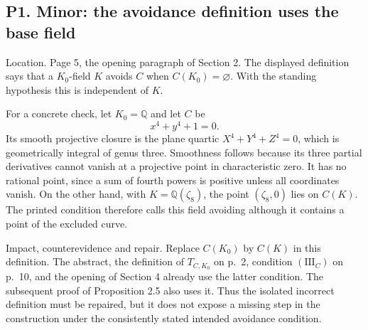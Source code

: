 \documentclass[10pt]{article}
\begin{document}
\subsection*{P1. Minor: the avoidance definition uses the base field}
Location. Page 5, the opening paragraph of Section 2. The displayed definition says that a \(K_0\)-field \(K\) avoids \(C\) when \(C(K_0)=\varnothing\). With the standing hypothesis this is independent of \(K\).\par
For a concrete check, let \(K_0=\mathbb Q\) and let \(C\) be \[x^4+y^4+1=0.\] Its smooth projective closure is the plane quartic \(X^4+Y^4+Z^4=0\), which is geometrically integral of genus three. Smoothness follows because its three partial derivatives cannot vanish at a projective point in characteristic zero. It has no rational point, since a sum of fourth powers is positive unless all coordinates vanish. On the other hand, with \(K=\mathbb Q(\zeta_8)\), the point \((\zeta_8,0)\) lies on \(C(K)\). The printed condition therefore calls this field avoiding although it contains a point of the excluded curve.\par
Impact, counterevidence and repair. Replace \(C(K_0)\) by \(C(K)\) in this definition. The abstract, the definition of \(T_{C,K_0}\) on p. 2, condition \((\mathrm{III}_C)\) on p. 10, and the opening of Section 4 already use the latter condition. The subsequent proof of Proposition 2.5 also uses it. Thus the isolated incorrect definition must be repaired, but it does not expose a missing step in the construction under the consistently stated intended avoidance condition.\par
\end{document}
